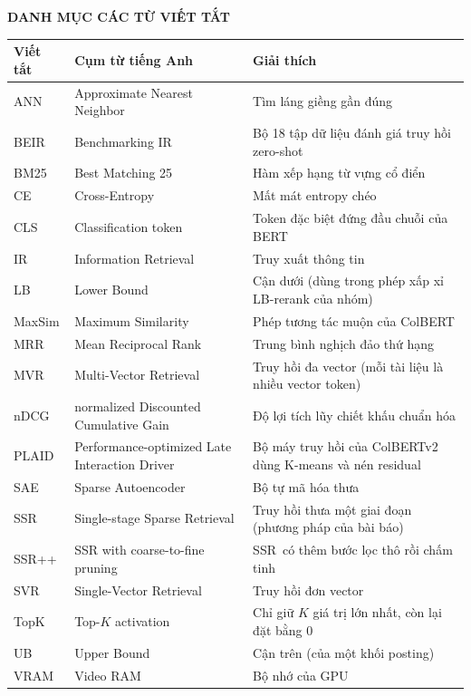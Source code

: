 \documentclass[a4paper,13pt]{extreport}
\theoremstyle{plain}
\newcommand{\ssr}{SSR}
\newcommand{\ssrpp}{SSR++}
\begin{document}
\begin{center}{\bfseries DANH MỤC CÁC TỪ VIẾT TẮT}\end{center}
\begin{center}
\small
\begin{tabular}{|l|p{5.2cm}|p{7cm}|}
\hline
\textbf{Viết tắt} & \textbf{Cụm từ tiếng Anh} & \textbf{Giải thích}\\
\hline
ANN & Approximate Nearest Neighbor & Tìm láng giềng gần đúng\\
\hline
BEIR & Benchmarking IR & Bộ 18 tập dữ liệu đánh giá truy hồi zero-shot\\
\hline
BM25 & Best Matching 25 & Hàm xếp hạng từ vựng cổ điển\\
\hline
CE & Cross-Entropy & Mất mát entropy chéo\\
\hline
CLS & Classification token & Token đặc biệt đứng đầu chuỗi của BERT\\
\hline
IR & Information Retrieval & Truy xuất thông tin\\
\hline
LB & Lower Bound & Cận dưới (dùng trong phép xấp xỉ LB-rerank của nhóm)\\
\hline
MaxSim & Maximum Similarity & Phép tương tác muộn của ColBERT\\
\hline
MRR & Mean Reciprocal Rank & Trung bình nghịch đảo thứ hạng\\
\hline
MVR & Multi-Vector Retrieval & Truy hồi đa vector (mỗi tài liệu là nhiều vector token)\\
\hline
nDCG & normalized Discounted Cumulative Gain & Độ lợi tích lũy chiết khấu chuẩn hóa\\
\hline
PLAID & Performance-optimized Late Interaction Driver & Bộ máy truy hồi của ColBERTv2 dùng K-means và nén residual\\
\hline
SAE & Sparse Autoencoder & Bộ tự mã hóa thưa\\
\hline
\ssr & Single-stage Sparse Retrieval & Truy hồi thưa một giai đoạn (phương pháp của bài báo)\\
\hline
\ssrpp & SSR with coarse-to-fine pruning & \ssr\ có thêm bước lọc thô rồi chấm tinh\\
\hline
SVR & Single-Vector Retrieval & Truy hồi đơn vector\\
\hline
TopK & Top-$K$ activation & Chỉ giữ $K$ giá trị lớn nhất, còn lại đặt bằng 0\\
\hline
UB & Upper Bound & Cận trên (của một khối posting)\\
\hline
VRAM & Video RAM & Bộ nhớ của GPU\\
\hline
\end{tabular}
\end{center}
\end{document}
